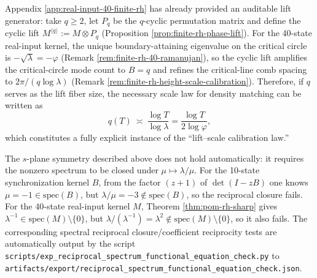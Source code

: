 \begin{remark}[Explicit lift generator for \texorpdfstring{$\lambda=\varphi^2$}{lambda=phi^2}: using cyclic lifts to make \texorpdfstring{$B$}{B} grow linearly]\label{rem:critical-circle-mode-growth-cyclic-lift}
Appendix \ref{app:real-input-40-finite-rh} has already provided an auditable lift generator: take \(q\ge 2\), let \(P_q\) be the \(q\)-cyclic permutation matrix and define the cyclic lift
\(
M^{\langle q\rangle}:=M\otimes P_q
\) (Proposition \ref{prop:finite-rh-phase-lift}).
For the 40-state real-input kernel, the unique boundary-attaining eigenvalue on the critical circle is \(-\sqrt{\lambda}=-\varphi\) (Remark \ref{rem:finite-rh-40-ramanujan}), so the cyclic lift amplifies the critical-circle mode count to \(B=q\) and refines the critical-line comb spacing to
\(
2\pi/(q\log\lambda)
\) (Remark \ref{rem:finite-rh-height-scale-calibration}).
Therefore, if \(q\) serves as the lift fiber size, the necessary scale law for density matching can be written as
\[
q(T)\ \asymp\ \frac{\log T}{\log\lambda}
=\frac{\log T}{2\log\varphi},
\]
which constitutes a fully explicit instance of the ``lift--scale calibration law.''
\end{remark}

\begin{remark}\label{rem:reciprocal-check-outcome}
The $s$-plane symmetry described above does not hold automatically: it requires the nonzero spectrum to be closed under $\mu\mapsto\lambda/\mu$.
For the 10-state synchronization kernel $B$, from the factor \((z+1)\) of \(\det(I-zB)\) one knows \(\mu=-1\in\mathrm{spec}(B)\), but \(\lambda/\mu=-3\notin\mathrm{spec}(B)\), so the reciprocal closure fails.
For the 40-state real-input kernel $M$, Theorem \ref{thm:pom-rh-sharp} gives \(\lambda^{-1}\in\mathrm{spec}(M)\setminus\{0\}\), but \(\lambda/(\lambda^{-1})=\lambda^2\notin\mathrm{spec}(M)\setminus\{0\}\), so it also fails.
The corresponding spectral reciprocal closure/coefficient reciprocity tests are automatically output by the script \texttt{scripts/exp\_reciprocal\_spectrum\_functional\_equation\_check.py} to
\texttt{artifacts/export/reciprocal\_spectrum\_functional\_equation\_check.json}.
\end{remark}
